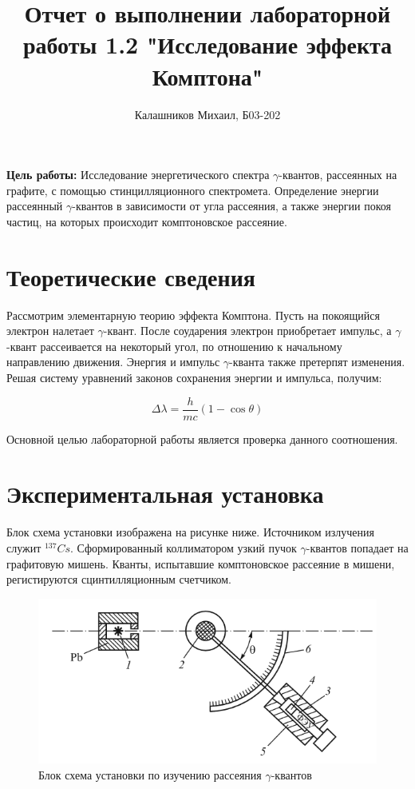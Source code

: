 \documentclass[14pt, a4paper]{report}
\title{\textbf{Отчет о выполнении лабораторной работы 1.2 "Исследование эффекта Комптона"}}
\author{Калашников Михаил, Б03-202}
\date{}
\begin{document}
\maketitle


\textbf{Цель работы:} Исследование энергетического спектра $\gamma$-квантов, рассеянных на графите, с помощью стинцилляционного спектромета. Определение энергии рассеянный $\gamma$-квантов в зависимости от угла рассеяния, а также энергии покоя частиц, на которых происходит комптоновское рассеяние.
\newline

\section{Теоретические сведения}

Рассмотрим элементарную теорию эффекта Комптона. Пусть на покоящийся электрон налетает $\gamma$-квант. После соударения электрон приобретает импульс, а $\gamma$-квант рассеивается на некоторый угол, по отношению к начальному направлению движения. Энергия и импульс $\gamma$-кванта также претерпят изменения. Решая систему уравнений законов сохранения энергии и импульса, получим:

\[\Delta\lambda=\frac{h}{mc}(1-\cos{\theta})\]

Основной целью лабораторной работы является проверка данного соотношения.

\section{Экспериментальная установка}

Блок схема установки изображена на рисунке ниже. Источником излучения служит $^{137}Cs$. Сформированный коллиматором узкий пучок $\gamma$-квантов попадает на графитовую мишень. Кванты, испытавшие комптоновское рассеяние в мишени, регистируются сцинтилляционным счетчиком.

\begin{figure}[H]
\centering
\includegraphics[scale=0.8]{../images/512-1}
\caption{Блок схема установки по изучению рассеяния $\gamma$-квантов}
\end{figure}
\end{document}
